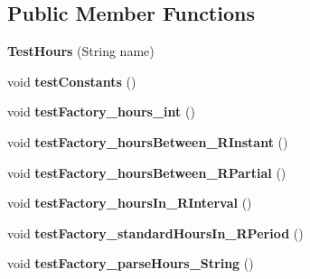 \subsection*{Public Member Functions}
\begin{DoxyCompactItemize}
\item 
\hypertarget{classorg_1_1joda_1_1time_1_1_test_hours_a0edced7670189576a9386fb39ed2408e}{{\bfseries Test\-Hours} (String name)}\label{classorg_1_1joda_1_1time_1_1_test_hours_a0edced7670189576a9386fb39ed2408e}

\item 
\hypertarget{classorg_1_1joda_1_1time_1_1_test_hours_a883de30cc1568760b8c16ca94cb03cfd}{void {\bfseries test\-Constants} ()}\label{classorg_1_1joda_1_1time_1_1_test_hours_a883de30cc1568760b8c16ca94cb03cfd}

\item 
\hypertarget{classorg_1_1joda_1_1time_1_1_test_hours_a3d9e5f459ea3dd172e33540ea491a0e2}{void {\bfseries test\-Factory\-\_\-hours\-\_\-int} ()}\label{classorg_1_1joda_1_1time_1_1_test_hours_a3d9e5f459ea3dd172e33540ea491a0e2}

\item 
\hypertarget{classorg_1_1joda_1_1time_1_1_test_hours_a9b06ca9d734b44b2fbe389cef00c9a1f}{void {\bfseries test\-Factory\-\_\-hours\-Between\-\_\-\-R\-Instant} ()}\label{classorg_1_1joda_1_1time_1_1_test_hours_a9b06ca9d734b44b2fbe389cef00c9a1f}

\item 
\hypertarget{classorg_1_1joda_1_1time_1_1_test_hours_ac4a2fd89546014442dff3d98ce91d341}{void {\bfseries test\-Factory\-\_\-hours\-Between\-\_\-\-R\-Partial} ()}\label{classorg_1_1joda_1_1time_1_1_test_hours_ac4a2fd89546014442dff3d98ce91d341}

\item 
\hypertarget{classorg_1_1joda_1_1time_1_1_test_hours_a0faaea4c653095ea2960c14f22b7c1df}{void {\bfseries test\-Factory\-\_\-hours\-In\-\_\-\-R\-Interval} ()}\label{classorg_1_1joda_1_1time_1_1_test_hours_a0faaea4c653095ea2960c14f22b7c1df}

\item 
\hypertarget{classorg_1_1joda_1_1time_1_1_test_hours_a4c7c3fb0d6dd56c5770d26463dd1a369}{void {\bfseries test\-Factory\-\_\-standard\-Hours\-In\-\_\-\-R\-Period} ()}\label{classorg_1_1joda_1_1time_1_1_test_hours_a4c7c3fb0d6dd56c5770d26463dd1a369}

\item 
\hypertarget{classorg_1_1joda_1_1time_1_1_test_hours_adca500f76f92eaef6d6918b20c4f683f}{void {\bfseries test\-Factory\-\_\-parse\-Hours\-\_\-\-String} ()}\label{classorg_1_1joda_1_1time_1_1_test_hours_adca500f76f92eaef6d6918b20c4f683f}


\end{DoxyCompactItemize}
